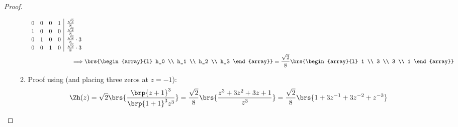 \begin{proof}
\begin{enumerate}
\begin{enumerate}
\begin{align*}
{\begin{array}{rrrr|l}
                0 &  0 &  0  &  1 & \frac{\sqrt{2}}{8}
            \\  1 &  0 &  0  &  0 & \frac{\sqrt{2}}{8}
            \\  0 &  1 &  0  &  0 & \frac{\sqrt{2}}{8}\cdot3
            \\  0 &  0 &  1  &  0 & \frac{\sqrt{2}}{8}\cdot3
          \end{array}}
          \\
          \implies&
          \brs{\begin{array}{l}
               h_0
            \\ h_1
            \\ h_2
            \\ h_3
          \end{array}}
          =
          \frac{\sqrt{2}}{8}\brs{\begin{array}{l}
                  1
               \\ 3
               \\ 3
               \\ 1
          \end{array}}
        \end{align*}

    \item Proof using  (and placing three zeros at $z=-1$):
      \begin{align*}
        \Zh(z)
          &= \sqrt{2} \brs{\frac{ \brp{z+1}^3 }
                                { \brp{1+1}^3 z^3 }}
           = \frac{\sqrt{2}}{8} \brs{\frac{ z^3 + 3z^2 + 3z + 1 }
                                          { z^3          }}
           = \frac{\sqrt{2}}{8} \brs{ 1 + 3z^{-1} + 3z^{-2} + z^{-3} }
      \end{align*}
  \end{enumerate}
\end{enumerate}
\end{proof}

